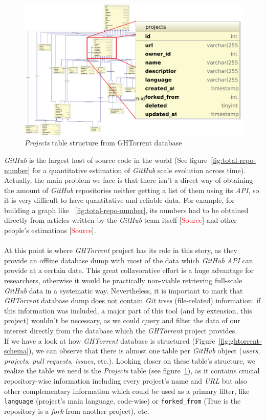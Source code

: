 \documentclass[a4paper, 12pt]{book}
\begin{document}
\begin{figure}
  \centering
  \includegraphics[width=16cm, keepaspectratio]{img/ghtorrent-schema-detail}
  \caption{\textit{Projects} table structure from GHTorrent database}
  \label{fig:ghtorrent-schema-detail}
\end{figure}
\emph{GitHub} is the largest host of source code in the world (See figure~\ref{fig:total-repo-number} for a quantitative
estimation of \emph{GitHub} scale evolution across time). Actually, the main problem we face is that there isn't a direct way
of obtaining the amount of \emph{GitHub} repositories neither getting a list of them using its \textit{API}, so it is
very difficult to have quantitative and reliable data. For example, for building a graph like ~\ref{fig:total-repo-number},
its numbers had to be obtained directly from articles written by the \emph{GitHub} team itself [\textcolor{red}{Source}]
and other people's estimations [\textcolor{red}{Source}].\\\\
At this point is where \emph{GHTorrent} project has its role in this story, as they provide an offline database dump with most
of the data which \emph{GitHub} \textit{API} can provide at a certain date. This great collavorative effort is a huge advantage
for researchers, otherwise it would be practically non-viable retrieving full-scale \emph{GitHub} data in a systematic way.
Nevertheless, it is important to mark that \emph{GHTorrent} database dump \underline{does not contain} \textit{Git trees}
(file-related) information: if this information was included, a major part of this tool (and by extension, this project) wouldn't
be necessary, as we could query and filter the data of our interest directly from the database which the \emph{GHTorrent} project provides.\\
If we have a look at how \emph{GHTorrent} database is structured (Figure~\ref{fig:ghtorrent-schema}), we can observe that
there is almost one table per \emph{GitHub} object (\textit{users}, \textit{projects}, \textit{pull requests}, \textit{issues}, etc.).
Looking closer on these table's structure, we realize the table we need is the \emph{Projects} table
(see figure~\ref{fig:ghtorrent-schema-detail}), as it contains crucial repository-wise information including every project's name
and \textit{URL} but also other complementary information which could be used as a primary filter, like \texttt{language} (project's main language,
code-wise) or \texttt{forked\_from} (True is the repository is a \textit{fork} from another project), etc.
\end{document}
